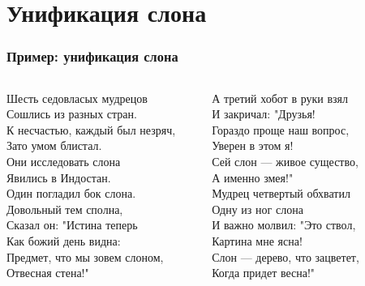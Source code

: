 \documentclass[xetex,mathserif,serif]{beamer}
\begin{document}
	\section{Унификация слона}

	\begin{frame}
		\frametitle{Пример: унификация слона}
		\begin{ssmall}
			\begin{columns}
				\begin{column}{0.33\textwidth}
					Шесть седовласых мудрецов \\
					Сошлись из разных стран. \\
					К несчастью, каждый был незряч, \\
					Зато умом блистал. \\
					Они исследовать слона \\
					Явились в Индостан. \\
					\vspace{5mm}
					Один погладил бок слона. \\
					Довольный тем сполна, \\
					Сказал он: "Истина теперь \\
					Как божий день видна: \\
					Предмет, что мы зовем слоном, ­\\
					Отвесная стена!" \\
				\end{column}
				\begin{column}{0.33\textwidth}
					А третий хобот в руки взял \\
					И закричал: "Друзья! \\
					Гораздо проще наш вопрос, \\
					Уверен в этом я! \\
					Сей слон --- живое существо, \\
					А именно змея!" \\
					\vspace{5mm}
					Мудрец четвертый обхватил \\
					Одну из ног слона \\
					И важно молвил: "Это ствол, \\
					Картина мне ясна! \\
					Слон --- дерево, что зацветет, \\
					Когда придет весна!" \\
				\end{column}
				\begin{column}{0.33\textwidth}

\end{column}
\end{columns}
\end{ssmall}
\end{frame}
\end{document}
